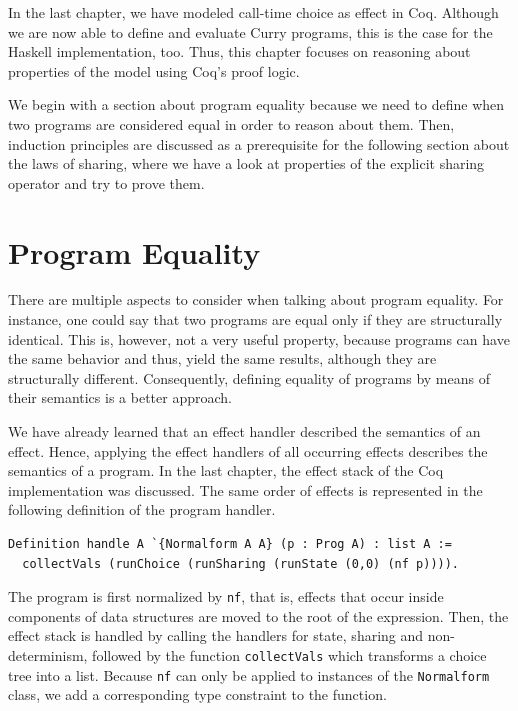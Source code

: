 \documentclass[a4paper, 11pt, fleqn, twoside, abstract=on]{scrreprt}
\newcommand{\cinl}[1]{\texttt{#1}}
\begin{document}
In the last chapter, we have modeled call-time choice as effect in Coq.
Although we are now able to define and evaluate Curry programs, this is the case for the Haskell implementation, too.
Thus, this chapter focuses on reasoning about properties of the model using Coq's proof logic.

We begin with a section about program equality because we need to define when two programs are considered equal in order to reason about them.
Then, induction principles are discussed as a prerequisite for the following section about the laws of sharing, where we have a look at properties
of the explicit sharing operator and try to prove them.

\section{Program Equality}

There are multiple aspects to consider when talking about program equality.
For instance, one could say that two programs are equal only if they are structurally identical.
This is, however, not a very useful property, because programs can have the same behavior and thus, yield the same results, although they are structurally different.
Consequently, defining equality of programs by means of their semantics is a better approach.

We have already learned that an effect handler described the semantics of an effect.
Hence, applying the effect handlers of all occurring effects describes the semantics of a program.
In the last chapter, the effect stack of the Coq implementation was discussed.
The same order of effects is represented in the following definition of the program handler.

\begin{verbatim}
Definition handle A `{Normalform A A} (p : Prog A) : list A :=
  collectVals (runChoice (runSharing (runState (0,0) (nf p)))).
\end{verbatim}

The program is first normalized by \cinl{nf}, that is, effects that occur inside components of data structures are moved to the root of the expression.
Then, the effect stack is handled by calling the handlers for state, sharing and non-determinism, followed by the function \cinl{collectVals} which transforms a choice tree into a list.
Because \cinl{nf} can only be applied to instances of the \cinl{Normalform} class, we add a corresponding type constraint to the function.
\end{document}
